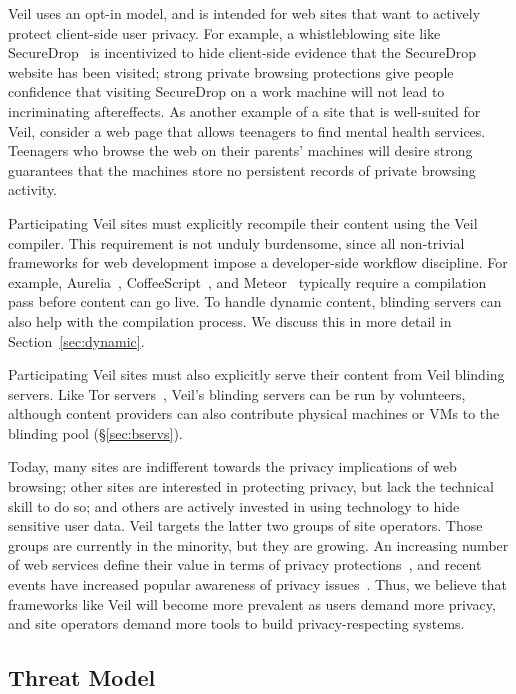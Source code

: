 Veil uses an opt-in model, and is intended
for web sites that want to actively protect
client-side user privacy. For example, a
whistleblowing site like SecureDrop~\cite{secureDrop}
is incentivized to hide client-side evidence
that the SecureDrop website has been visited;
strong private browsing protections give people
confidence that visiting SecureDrop on a work
machine will not lead to incriminating aftereffects.
As another example of a site that is well-suited
for Veil, consider a web page that allows
teenagers to find mental health services. Teenagers
who browse the web on their parents' machines 
will desire strong guarantees that the
machines store no persistent records of private
browsing activity.

Participating Veil sites must explicitly recompile
their content using the Veil compiler. This
requirement is not unduly burdensome, since
all non-trivial frameworks for web development impose
a developer-side workflow discipline. For example,
Aurelia~\cite{aurelia}, CoffeeScript~\cite{coffeeScript}, and
Meteor~\cite{meteor} typically require a
compilation pass before content can go live.
To handle dynamic content, blinding servers
can also help with the compilation process. We
discuss this in more detail in Section~\ref{sec:dynamic}.

Participating Veil sites must also explicitly serve
their content from Veil blinding servers. Like
Tor servers~\cite{tor}, Veil's blinding servers
can be run by volunteers, although content providers
can also contribute physical machines or VMs to
the blinding pool (\S\ref{sec:bservs}).

Today, many sites are indifferent
towards the privacy implications of web browsing;
other sites are interested in protecting privacy,
but lack the technical skill to do so; and others
are actively invested in using technology to hide
sensitive user data. Veil targets the latter
two groups of site operators. Those groups are
currently in the minority, but they are growing.
An increasing number of web services define their
value in terms of privacy protections~\cite{duckduck,enigma,privio,privly},
and recent events have increased popular
awareness of privacy issues~\cite{torAfterSnowden}.
Thus, we believe that frameworks like Veil will
become more prevalent as users demand more
privacy, and site operators demand more tools to
build privacy-respecting systems.

\subsection{Threat Model}
\label{sec:threatModel}

